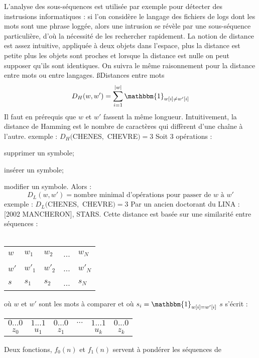 \documentclass[a4paper,11pt]{article}
\begin{document}
 \p L'analyse des sous-séquences est utilisée par exemple pour détecter des
 instrusions informatiques : si l'on considère le langage des fichiers de logs
 dont les mots sont une phrase loggée, alors une intrusion se révèle par une
 sous-séquence particulière, d'où la nécessité de les rechercher rapidement.
 La notion de distance est assez intuitive, appliquée à deux objets
 dans l'espace, plus la distance est petite plus les objets sont
 proches et lorsque la distance est nulle on peut supposer qu'ils sont
 identiques. On suivra le même raisonnement pour la distance entre
 mots ou entre langages.
 \ss{Distances entre mots}
  \[
  D_H(w, w') = \sum^{\mid{}w\mid}_{i = 1} \mathbbm{1}_{w[i] \neq w'[i]}
  \]
  \p Il faut en prérequis que $w$ et $w'$ fassent la même longueur.
  Intuitivement, la distance de Hamming est le nombre de caractères qui
  diffèrent d'une chaîne à l'autre.
  \p exemple : $D_H($CHENES$,$ CHEVRE$)=3$
  \p Soit 3 opérations :\\
  \bi
   \item supprimer un symbole;
   \item insérer un symbole;
   \item modifier un symbole.
  \ei
  \p Alors :
  \[
  D_L(w, w') = \text{nombre minimal d'opérations pour passer de }w\text{ à }w'
  \]
  \p exemple : $D_L($CHENES$,$ CHEVRE$)=3$
  \p Par un ancien doctorant du LINA : [2002 MANCHERON], STARS.
  \p Cette distance est basée sur une similarité entre séquences :\\ \\
  \begin{tabular}{ l | l l l l }
   $w$  & $w_1$  & $w_2$  & ... & $w_N$  \\
   $w'$ & $w'_1$ & $w'_2$ & ... & $w'_N$ \\ \hline
   $s$  & $s_1$ & $s_2$ & ... & $s_N$ \\
  \end{tabular}
  \p où $w$ et $w'$ sont les mots à comparer et où
  $s_i=\mathbbm{1}_{w[i] = w'[i]}$
  \p $s$ s'écrit :
  \begin{tabular}{ c c c c c c }
   $0...0$  & $1...1$ & $0...0$ & $...$ & $1...1$ & $0...0$ \\
   $z_0$    & $u_1$   & $z_1$   &       & $u_k$   & $z_k$   \\
  \end{tabular}
  \p Deux fonctions, $f_0(n)$ et $f_1(n)$ servent à pondérer les séquences de
\end{document}
